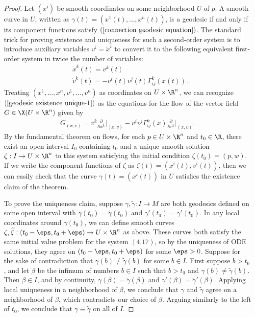 \begin{proof}
Let $(x^i)$ be smooth coordinates on some neighborhood $U$ of $p$. A smooth curve in $U$, written as $\gamma(t)=(x^1(t),\dots,x^n(t))$, 
is a geodesic if and only if its component functions satisfy $(\ref{connection geodesic equation})$. The standard trick for proving existence 
and uniqueness for such a second-order system is to introduce auxiliary variables $v^i=\dot{x}^i$ to convert it to the following equivalent 
first-order system in twice the number of variables:
\begin{equation}\label{geodesic existence unique-1}
\begin{aligned}
&\dot{x}^k(t)=v^k(t)\\
&\dot{v}^k(t)=-v^i(t)v^j(t)\Gamma_{ij}^k(x(t)).
\end{aligned}
\end{equation}
Treating $(x^1,\dots,x^n,v^1,\dots,v^n)$ as coordinates on $U\times\R^n$, we can recognize $(\ref{geodesic existence unique-1})$ as the equations for the flow of 
the vector field $G\in\X(U\times\R^n)$ given by
\begin{align}\label{geodesic existence unique-2}
G_{(x,v)}=v^k\frac{\partial}{\partial x^k}\Big|_{(x,v)}-v^iv^j\Gamma_{ij}^k(x)\frac{\partial}{\partial v^k}\Big|_{(x,v)}.
\end{align}
By the fundamental theorem on flows, for each $p\in U\times\R^n$ and $t_0\in\R$, there exist an open interval $I_0$ containing $t_0$ and a 
unique smooth solution $\zeta:I\to U\times\R^n$ to this system satisfying the initial condition $\zeta(t_0)=(p,w)$. If we write the component 
functions of $\zeta$ as $\zeta(t)=(x^i(t),v^i(t))$, then we can easily check that the curve $\gamma(t)=(x^i(t))$ in $U$ satisfies the existence 
claim of the theorem.\par
To prove the uniqueness claim, suppose $\gamma,\tilde{\gamma}:I\to M$ are both geodesics defined on some open interval with $\gamma(t_0)=\tilde{\gamma}(t_0)$ 
and $\gamma'(t_0)=\gamma'(t_0)$. In any local coordinates around $\gamma(t_0)$, we can define smooth curves $\zeta,\widetilde{\zeta}:(t_0-\eps,t_0+\eps)\to U\times\R^n$ 
as above. These curves both satisfy the same initial value problem for the system $(4.17)$, so by the uniqueness of ODE solutions, they agree on $(t_0-\eps,t_0+\eps)$ 
for some $\eps>0$. Suppose for the sake of contradiction that $\gamma(b)\neq\tilde{\gamma}(b)$ for some $b\in I$. First suppose $b>t_0$, and let $\beta$ be the 
infimum of numbers $b\in I$ such that $b>t_0$ and $\gamma(b)\neq\tilde{\gamma}(b)$. Then $\beta\in I$, and by continuity, $\gamma(\beta)=\tilde{\gamma}(\beta)$ 
and $\gamma'(\beta)=\tilde{\gamma}'(\beta)$. Applying local uniqueness in a neighborhood of $\beta$, we conclude that $\gamma$ and $\tilde{\gamma}$ agree on a 
neighborhood of $\beta$, which contradicts our choice of $\beta$. Arguing similarly to the left of $t_0$, we conclude that $\gamma\equiv\tilde{\gamma}$ on all of $I$.
\end{proof}
